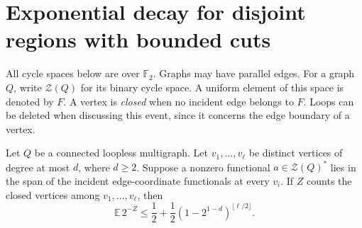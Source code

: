 \section{Exponential decay for disjoint regions with bounded cuts}
\label{sec:second-order-exponential-cuts}

All cycle spaces below are over $\mathbb F_2$.
Graphs may have parallel edges.
For a graph $Q$, write $\mathcal Z(Q)$ for its binary cycle space.
A uniform element of this space is denoted by $F$.
A vertex is \emph{closed} when no incident edge belongs to $F$.
Loops can be deleted when discussing this event, since it concerns the edge boundary of a vertex.

\begin{lemma}\label{lem:common-star-functional}
Let $Q$ be a connected loopless multigraph.
Let $v_1,\ldots,v_\ell$ be distinct vertices of degree at most $d$, where $d\ge2$.
Suppose a nonzero functional $a\in\mathcal Z(Q)^*$ lies in the span of the incident edge-coordinate functionals at every $v_i$.
If $Z$ counts the closed vertices among $v_1,\ldots,v_\ell$, then
\[
 \mathbb E\,2^{-Z}
 \le\frac12+\frac12\left(1-2^{1-d}\right)^{\lfloor\ell/2\rfloor}.
\]
\end{lemma}

